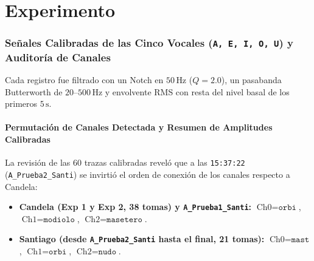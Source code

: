 \documentclass[11pt, a4paper]{article}
\begin{document}
\part{Experimento}
\section{Señales Calibradas de las Cinco Vocales (\texttt{A, E, I, O, U}) y Auditoría de Canales}

Cada registro fue filtrado con un Notch en $50\,\text{Hz}$ ($Q=2.0$), un pasabanda Butterworth de $20\text{--}500\,\text{Hz}$ y envolvente RMS con resta del nivel basal de los primeros $5\,\text{s}$.

\subsection{Permutación de Canales Detectada y Resumen de Amplitudes Calibradas}
La revisión de las 60 trazas calibradas reveló que a las \texttt{15:37:22} (\texttt{A\_Prueba2\_Santi}) se invirtió el orden de conexión de los canales respecto a Candela:
\begin{itemize}\setlength{\itemsep}{1pt}
    \item \textbf{Candela (Exp 1 y Exp 2, 38 tomas) y \texttt{A\_Prueba1\_Santi}:} $\text{Ch0} = \texttt{orbi}$, $\text{Ch1} = \texttt{modiolo}$, $\text{Ch2} = \texttt{masetero}$.
    \item \textbf{Santiago (desde \texttt{A\_Prueba2\_Santi} hasta el final, 21 tomas):} $\text{Ch0} = \texttt{mast}$, $\text{Ch1} = \texttt{orbi}$, $\text{Ch2} = \texttt{nudo}$.
\end{itemize}
\end{document}
